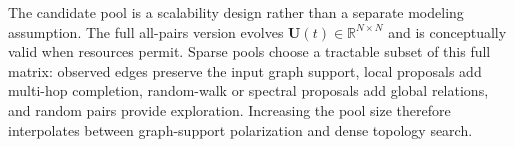 \documentclass{article}
\theoremstyle{plain}
\theoremstyle{definition}
\theoremstyle{remark}
\begin{document}
The candidate pool is a scalability design rather than a separate modeling
assumption. The full all-pairs version evolves $\mathbf U(t)\in\mathbb
    R^{N\times N}$ and is conceptually valid when resources permit. Sparse pools
choose a tractable subset of this full matrix: observed edges preserve the
input graph support, local proposals add multi-hop completion, random-walk or
spectral proposals add global relations, and random pairs provide exploration.
Increasing the pool size therefore interpolates between graph-support
polarization and dense topology search.
\end{document}
